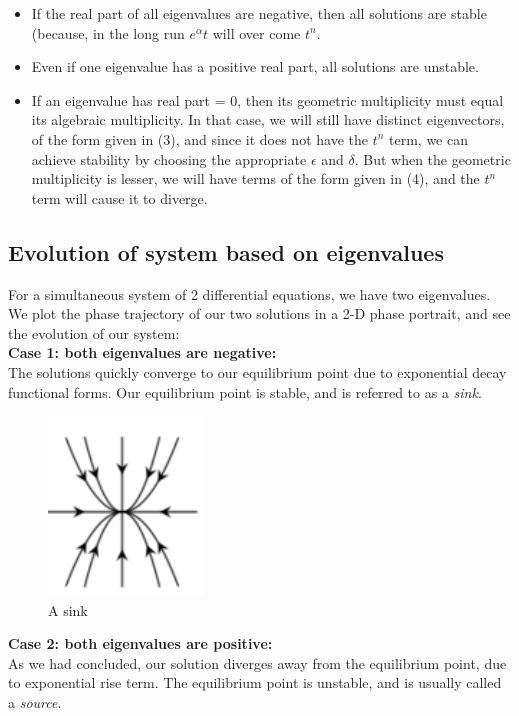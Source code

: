 \documentclass{article}
\begin{document}
\begin{itemize}
    \item If the real part of all eigenvalues are negative, then all solutions are stable (because, in the long run $e^\alpha t$ will over come $t^n$.
    \item Even if one eigenvalue has a positive real part, all solutions are unstable.
    \item If an eigenvalue has real part = 0, then its geometric multiplicity must equal its algebraic multiplicity. In that case, we will still have distinct eigenvectors, of the form  given in (3), and since it does not have the $t^n$ term, we can achieve stability by choosing the appropriate $\epsilon$ and $\delta$. But when the geometric multiplicity is lesser, we will have terms of the form given in (4), and the $t^n$ term will cause it to diverge.
\end{itemize}

\subsection{Evolution of system based on eigenvalues}

For a simultaneous system of 2 differential equations, we have two eigenvalues. We plot the phase trajectory of our two solutions in a 2-D phase portrait, and see the evolution of our system:
\\

\textbf{Case 1: both eigenvalues are negative: }\\
The solutions quickly converge to our equilibrium point due to exponential decay functional forms. Our equilibrium point is stable, and is referred to as a \emph{sink}.
\begin{figure}[h]
    \centering
    \includegraphics[scale = 0.9]{sink.png}
    \caption{A sink}
    \label{fig:my_label}
\end{figure}

\textbf{Case 2: both eigenvalues are positive: }\\
As we had concluded, our solution diverges away from the equilibrium point, due to exponential rise term. The equilibrium point is unstable, and is usually called a \emph{source}.
\end{document}
